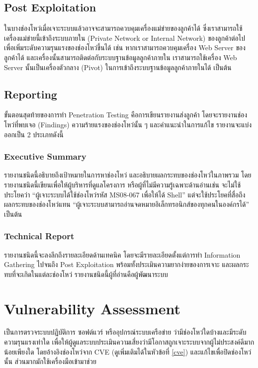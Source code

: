 \subsection{Post Exploitation}

ในบางช่องโหว่เมื่อเจาะระบบแล้วอาจจะสามารถควบคุมเครื่องแม่ข่ายของลูกค้าได้ ซึ่งเราสามารถใช้เครื่องแม่ข่ายนี้เข้าถึงระบบภายใน (Private Network or Internal Network)\cite{wiki:internal}  ของลูกค้าต่อไป เพื่อเพิ่มระดับความรุนแรงของช่องโหว่ขึ้นได้ เช่น หากเราสามารถควบคุมเครื่อง Web Server ของลูกค้าได้ และเครื่องนั้นสามารถติดต่อกับระบบฐานข้อมูลลูกค้าภายใน เราสามารถใช้เครื่อง Web Server นั้นเป็นเครื่องตัวกลาง (Pivot)\cite{pivot} ในการเข้าถึงระบบฐานข้อมูลลูกค้าภายในได้ เป็นต้น

\subsection{Reporting}

ขั้นตอนสุดท้ายของการทำ Penetration Testing คือการเขียนรายงานส่งลูกค้า โดยจะรายงานช่องโหว่ที่พบเจอ (Findings) ความร้ายแรงของช่องโหว่นั้น ๆ และคำแนะนำในการแก้ไข
รายงานจะแบ่งออกเป็น 2 ประเภทดังนี้

\subsubsection{Executive Summary}

รายงานชนิดนี้อธิบายถึงเป้าหมายในการหาช่องโหว่ และอธิบายผลกระทบของช่องโหว่ในภาพรวม โดยรายงานชนิดนี้เขียนเพื่อให้ผู้บริหารที่ดูแลโครงการ หรือผู้ที่ไม่มีความรู้เฉพาะด้านอ่านเช่น จะไม่ใช้ประโยคว่า “ผู้เจาะระบบได้ใช้ช่องโหว่รหัส MS08-067 เพื่อให้ได้ Shell” แต่จะใช้ประโยคที่สื่อถึงผลกระทบของช่องโหว่แทน “ผู้เจาะระบบสามารถอ่านจดหมายอิเล็กทรอนิกส์ของทุกคนในองค์กรได้” เป็นต้น

\subsubsection{Technical Report}

รายงานชนิดนี้จะลงลึกถึงรายละเอียดด้านเทคนิค โดยจะมีรายละเอียดตั้งแต่การทำ Information Gathering ไปจนถึง Post Exploitation พร้อมทั้งประเมินความยากง่ายของการเจาะ และผลกระทบที่จะเกิดในแต่ละช่องโหว่ รายงานชนิดนี้ผู้ที่อ่านคือผู้พัฒนาระบบ

\section{Vulnerability Assessment}

เป็นการตรวจระบบปฏิบัติการ ซอฟต์แวร์ หรืออุปกรณ์ระบบเครือข่าย ว่ามีช่องโหว่ใดบ้างและมีระดับความรุนแรงเท่าใด เพื่อให้ผู้ดูแลระบบประเมินความเสี่ยงว่ามีโอกาสถูกเจาะระบบจากผู้ไม่ประสงค์ดีมากน้อยเพียงใด โดยอ้างอิงช่องโหว่จาก CVE (ดูเพิ่มเติมได้ในหัวข้อที่ \ref{cve}) และแก้ไขเพื่อปิดช่องโหว่นั้น ส่วนมากมักใช้เครื่องมือเข้ามาช่วย 

